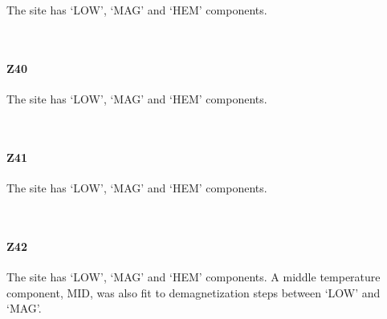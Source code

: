 \documentclass[11pt]{article}
\begin{document}
    The site has `LOW', `MAG' and `HEM' components.



    \begin{center}
    \end{center}
    { \hspace*{\fill} \\}
    
    \paragraph{Z40}\label{z40}

    The site has `LOW', `MAG' and `HEM' components.



    \begin{center}
    \end{center}
    { \hspace*{\fill} \\}
    
    \paragraph{Z41}\label{z41}

The site has `LOW', `MAG' and `HEM' components.



    \begin{center}
    \end{center}
    { \hspace*{\fill} \\}
    
    \paragraph{Z42}\label{z42}

    The site has `LOW', `MAG' and `HEM' components. A middle temperature
component, MID, was also fit to demagnetization steps between `LOW' and
`MAG'.



    \begin{center}
    \end{center}
    { \hspace*{\fill} \\}
    
\end{document}
